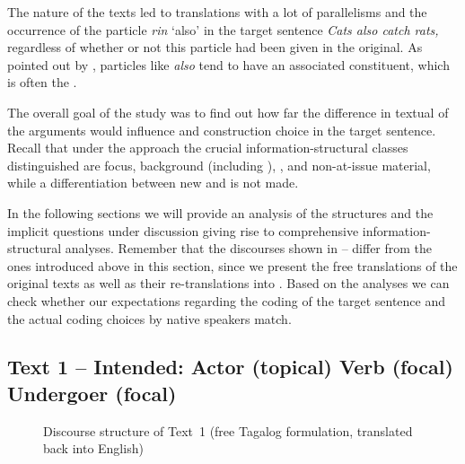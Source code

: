 \documentclass[output=paper,
,modfonts
,nonflat]{langsci/langscibook}
\begin{document}
The nature of the texts led to translations with a lot of parallelisms and the occurrence of the particle \textit{rin} `also' in the target sentence \textit{Cats also catch rats,} regardless of whether or not this particle had been given in the  original. As pointed out by \cite{krima99}, particles like \textit{also} tend to have an associated constituent, which is often the .

The overall goal of the study was to find out how far the difference in textual  of the arguments would influence  and construction choice in the target sentence.  Recall that under the  approach \citep{riear18b} the crucial information-structural classes distinguished are focus, background (including ), , and non-at-issue material, while a differentiation between new and  is not made.
 
In the following sections we will provide an analysis of the  structures and the implicit questions under discussion giving rise to comprehensive information-struc\-tu\-ral analyses.  Remember that the discourses shown in -- differ from the ones introduced above in this section, since we present the free  translations of the original texts as well as their re-translations into . Based on the analyses we can check whether our expectations regarding the coding of the target sentence and the actual coding choices by native speakers match.

\subsection{Text 1 -- Intended: Actor (topical) Verb (focal) Undergoer (focal)}\label{sect:text1}

\begin{figure}
\caption{Discourse structure of Text~1 (free Tagalog formulation, translated back into English)}
\label{fig:text1_analysis}
\end{figure}
\end{document}
